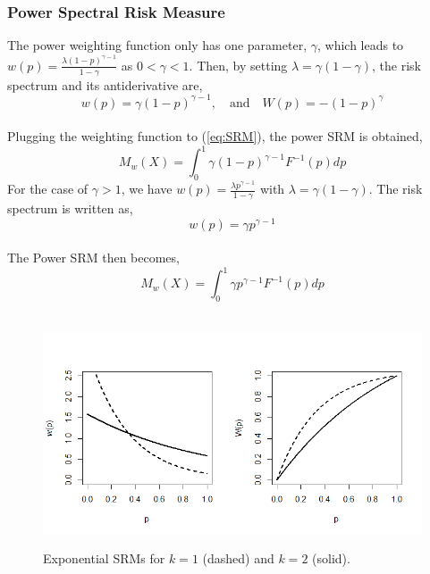 \subsubsection{Power Spectral Risk Measure}
The power weighting function only has one parameter, $\gamma$, which leads to $w(p)= \frac{\lambda (1-p)^{\gamma-1}}{1-\gamma}$ as $0<\gamma<1$. Then, by setting $\lambda =\gamma(1-\gamma)$, the risk spectrum and its antiderivative are, 
\begin{equation}\label{eq:wp}
 w(p)=\gamma(1-p)^{\gamma-1},\quad \mbox{and} \quad  W(p)=-(1-p)^{\gamma}
 \end{equation}\\
  Plugging the weighting function to (\ref{eq:SRM}), the power SRM is obtained,
 \begin{equation}\label{eq:PSRM}
 M_{w}(X)= \int^1_{0} \gamma(1-p)^{\gamma-1}F^{-1}(p)dp
\end{equation}
 For the case of $\gamma >1$, we have $w(p)= \frac{\lambda p^{\gamma-1}}{1-\gamma}$ with $\lambda =\gamma(1-\gamma)$. The risk spectrum is written as, 
\begin{equation}\label{eq:wp2}
 w(p)= \gamma p^{\gamma-1} 
\end{equation}\\
The Power SRM then becomes,
\begin{equation}\label{eq:PSRM2}
 M_{w}(X)= \int^1_{0} \gamma p^{\gamma-1}F^{-1}(p)dp
 \end{equation}\\

\begin{figure}
	\begin{center}
		\includegraphics[scale = 0.7]{Figures/Fig1-1.png}\\
	\end{center}
	\caption{Exponential SRMs for $k=1$ (dashed) and $k=2$ (solid).}\label{Fig1:EPSRM}
\end{figure}

